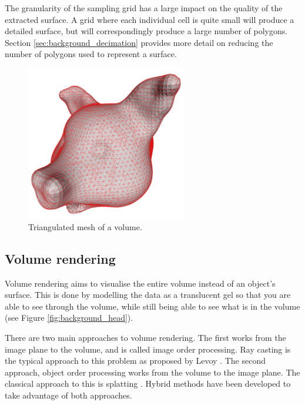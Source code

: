 The granularity of the sampling grid has a large impact on the quality of the
extracted surface. A grid where each individual cell is quite small will
produce a detailed surface, but will correspondingly produce a large number of
polygons. Section \ref{sec:background_decimation} provides more detail on
reducing the number of polygons used to represent a surface.

\begin{figure}[h!]
  \begin{center}
    \includegraphics[width=70mm]{triangulated_mesh}
  \end{center}
  \caption{Triangulated mesh of a volume.}
  \label{fig:background_mesh}
\end{figure}


\subsection{Volume rendering}
\label{sub:background_volume}

Volume rendering aims to visualise the entire volume instead of an object's
surface. This is done by modelling the data as a translucent gel so that you
are able to see through the volume, while still being able to see what is in
the volume (see Figure \ref{fig:background_head}).

There are two main approaches to volume rendering. The first works from the
image plane to the volume, and is called image order processing. Ray casting is
the typical approach to this problem as proposed by Levoy \citep{levoy88}. The
second approach, object order processing works from the volume to the image
plane. The classical approach to this is splatting \citep{westover89}.  Hybrid
methods have been developed to take advantage of both approaches.

